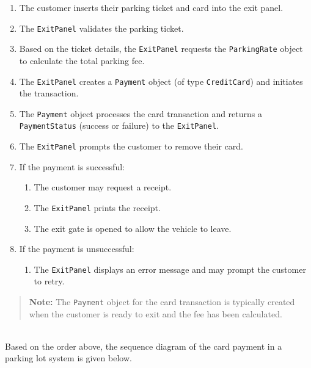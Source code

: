 \begin{enumerate}
\item
\protect{}\label{-oUnmIDjrEsfNT4F1U6LC}
The customer inserts their parking ticket and card into the exit panel.
\item
\protect{}\label{CchPinofffiMpeaTqdeTQ}
The \texttt{ExitPanel} validates the parking ticket.
\item
\protect{}\label{gC5JKsbNULexSUkHMiFAR}
Based on the ticket details, the \texttt{ExitPanel} requests the \texttt{ParkingRate} object to calculate the total parking fee.
\item
\protect{}\label{UWHc1qjW8j9tVApMAq_Vv}
The \texttt{ExitPanel} creates a \texttt{Payment} object (of type \texttt{CreditCard}) and initiates the transaction.
\item
\protect{}\label{8XXG27QuBkv4D8faR-lQ9}
The \texttt{Payment} object processes the card transaction and returns a \texttt{PaymentStatus} (success or failure) to the \texttt{ExitPanel}.
\item
\protect{}\label{k5SXdu1hi4rX45IU_3EiS}
The \texttt{ExitPanel} prompts the customer to remove their card.
\item
\protect{}\label{nopXZSAzjErze3jPpUUPW}
If the payment is successful:

\begin{enumerate}
\item
The customer may request a receipt.
\item
The \texttt{ExitPanel} prints the receipt.
\item
The exit gate is opened to allow the vehicle to leave.
\end{enumerate}
\item
\protect{}\label{FRSfaXJiN9syOI0Buh45w}
If the payment is unsuccessful:

\begin{enumerate}
\item
The \texttt{ExitPanel} displays an error message and may prompt the customer to retry.
\end{enumerate}
\end{enumerate}
\begin{quote}
\textbf{Note:} The \texttt{Payment} object for the card transaction is typically created when the customer is ready to exit and the fee has been calculated.
\end{quote}
\\
Based on the order above, the sequence diagram of the card payment in a parking lot system is given below.

